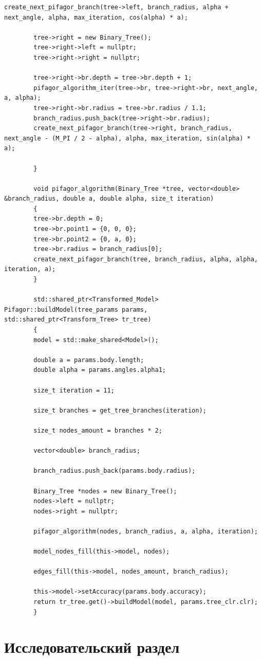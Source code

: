 \documentclass[a4paper,12pt]{article}
\begin{document}
\begin{lstlisting}[label=lst1,caption=Реализация обнаженного дерева Пифагора]
		create_next_pifagor_branch(tree->left, branch_radius, alpha + next_angle, alpha, max_iteration, cos(alpha) * a);
		
		tree->right = new Binary_Tree();
		tree->right->left = nullptr;
		tree->right->right = nullptr;
		
		tree->right->br.depth = tree->br.depth + 1;
		pifagor_algorithm_iter(tree->br, tree->right->br, next_angle, a, alpha);
		tree->right->br.radius = tree->br.radius / 1.1;
		branch_radius.push_back(tree->right->br.radius);
		create_next_pifagor_branch(tree->right, branch_radius, next_angle - (M_PI / 2 - alpha), alpha, max_iteration, sin(alpha) * a);
		
		}
		
		void pifagor_algorithm(Binary_Tree *tree, vector<double> &branch_radius, double a, double alpha, size_t iteration)
		{
		tree->br.depth = 0;
		tree->br.point1 = {0, 0, 0};
		tree->br.point2 = {0, a, 0};
		tree->br.radius = branch_radius[0];
		create_next_pifagor_branch(tree, branch_radius, alpha, alpha, iteration, a);
		}
		
		std::shared_ptr<Transformed_Model> Pifagor::buildModel(tree_params params, std::shared_ptr<Transform_Tree> tr_tree)
		{
		model = std::make_shared<Model>();
		
		double a = params.body.length;
		double alpha = params.angles.alpha1;
		
		size_t iteration = 11;
		
		size_t branches = get_tree_branches(iteration);
		
		size_t nodes_amount = branches * 2;
		
		vector<double> branch_radius;
		
		branch_radius.push_back(params.body.radius);
		
		Binary_Tree *nodes = new Binary_Tree();
		nodes->left = nullptr;
		nodes->right = nullptr;
		
		pifagor_algorithm(nodes, branch_radius, a, alpha, iteration);
		
		model_nodes_fill(this->model, nodes);
		
		edges_fill(this->model, nodes_amount, branch_radius);
		
		this->model->setAccuracy(params.body.accuracy);
		return tr_tree.get()->buildModel(model, params.tree_clr.clr);
		}
	\end{lstlisting}
	
	\section{Исследовательский раздел}
		
\end{document}
